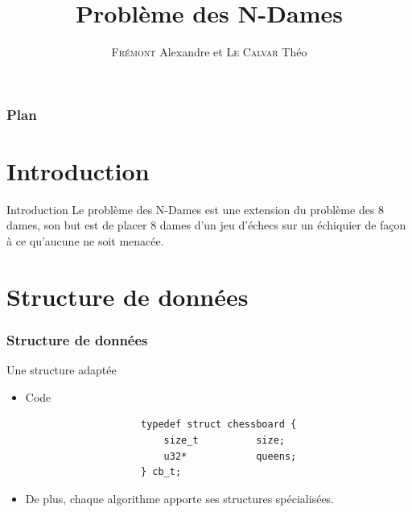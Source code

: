 \documentclass[9pt,a4paper]{beamer}
\author{\textsc{Frémont} Alexandre et \textsc{Le Calvar} Théo}
\title{Problème des N-Dames}
\begin{document}
\lstset{style=customc}

\begin{frame}
\titlepage
\end{frame}

\begin{frame}
	\frametitle{Plan}
	\tableofcontents
\end{frame}

\section{Introduction}
\begin{frame}

	\begin{block}{Introduction}
	Le problème des N-Dames est une extension du problème des 8 dames, son
	but est de placer 8 dames d’un jeu d’échecs sur un échiquier de façon à ce
	qu’aucune ne soit menacée.

	\end{block}

\end{frame}

\section{Structure de données}
\begin{frame}[fragile]
	\frametitle{Structure de données}
	\begin{block}{Une structure adaptée}
		\begin{itemize}
			\item Code
				\begin{lstlisting}
					typedef struct chessboard {
						size_t          size;
						u32*            queens;
					} cb_t;
				\end{lstlisting}
			\item 	De plus, chaque algorithme apporte ses structures spécialisées.
		\end{itemize}
	\end{block}
\end{frame}
\end{document}
